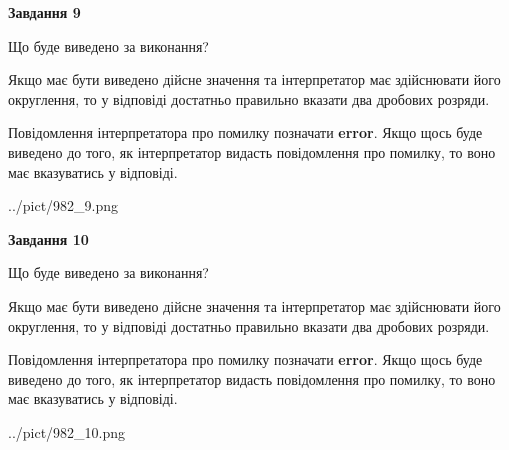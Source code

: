 \documentclass[12pt, ukrainian]{article}
\begin{document}
{\begin {Large}
{\begin {center}\textbf{Завдання 9}\end {center}}\par
Що буде виведено за виконання? \par

Якщо має бути виведено дійсне значення та інтерпретатор має здійснювати його округлення, 
то у відповіді достатньо правильно вказати два дробових розряди.

Повідомлення інтерпретатора про помилку позначати \textbf{error}.
Якщо щось буде виведено до того, як інтерпретатор видасть повідомлення про помилку, 
то воно має вказуватись у відповіді. \par

\begin{center}
	{../pict/982_9.png}
\end{center}
\newpage

{\begin {center}\textbf{Завдання 10}\end {center}}\par
Що буде виведено за виконання? \par

Якщо має бути виведено дійсне значення та інтерпретатор має здійснювати його округлення, 
то у відповіді достатньо правильно вказати два дробових розряди.

Повідомлення інтерпретатора про помилку позначати \textbf{error}.
Якщо щось буде виведено до того, як інтерпретатор видасть повідомлення про помилку, 
то воно має вказуватись у відповіді. \par

\begin{center}
	{../pict/982_10.png}
\end{center}
\newpage

\end {Large}}
\end{document}
